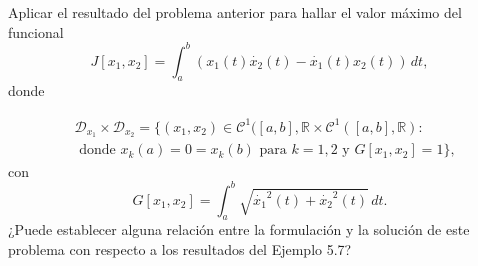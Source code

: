 \documentclass{ejercicios}
\begin{document}
\begin{exercise}
  Aplicar el resultado del problema anterior para hallar el valor máximo del funcional
  \[
    J[x_1,x_2] = \int_{a}^{b}(x_1(t)\dot{x_2}(t) - \dot{x_1}(t)x_2(t))\,dt ,
  \]
  donde

  \[
  \begin{aligned}
    & \mathcal{D}_{x_1}\times\mathcal{D}_{x_2} = \{(x_1,x_2)\in\mathcal{C}^1([a,b],\mathbb{R}\times\mathcal{C}^1([a,b],\mathbb{R}): \\
    & \text{ donde }x_k(a) = 0 = x_k(b)\text{ para }k = 1,2\text{ y }G[x_1,x_2] = 1\},
  \end{aligned}
  \]
  con
  \[G[x_1,x_2] = \int_{a}^{b}\sqrt{\dot{x_1}^2(t) + \dot{x_2}^2(t)}\,dt.\]
  ¿Puede establecer alguna relación entre la formulación y la solución de este problema con respecto a los resultados del Ejemplo 5.7?
\end{exercise}
\end{document}
